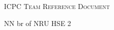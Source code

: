 \documentclass[a4paper]{article}
\begin{document}
	\thispagestyle{fancy}
	
	\begin{center}
		\Huge\textsc{ICPC Team Reference Document}
		
		\huge NN br of NRU HSE 2
		
		\vspace{0.50cm}
	\end{center}
	
	\begin{multicols*}{2}
		\tableofcontents
		
		\setcounter{page}{1}
	\end{multicols*}
	\enlargethispage*{\baselineskip}
	\pagebreak
	
	
	\setcounter{page}{2}
\end{document}
